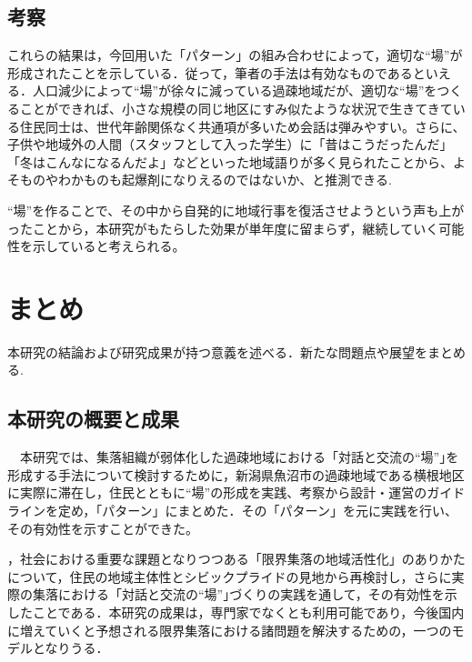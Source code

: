 \documentclass[a4paper]{jsarticle}
\begin{document}
\subsection{考察}
これらの結果は，今回用いた「パターン」の組み合わせによって，適切な“場”が形成されたことを示している．従って，筆者の手法は有効なものであるといえる．人口減少によって“場”が徐々に減っている過疎地域だが、適切な“場”をつくることができれば、小さな規模の同じ地区にすみ似たような状況で生きてきている住民同士は、世代年齢関係なく共通項が多いため会話は弾みやすい。さらに、子供や地域外の人間（スタッフとして入った学生）に「昔はこうだったんだ」「冬はこんなになるんだよ」などといった地域語りが多く見られたことから、よそものやわかものも起爆剤になりえるのではないか、と推測できる.\par“場”を作ることで、その中から自発的に地域行事を復活させようという声も上がったことから，本研究がもたらした効果が単年度に留まらず，継続していく可能性を示していると考えられる。
\newpage
\section{まとめ}
本研究の結論および研究成果が持つ意義を述べる．新たな問題点や展望をまとめる.

\subsection{本研究の概要と成果}
　本研究では、集落組織が弱体化した過疎地域における「対話と交流の“場”｣を形成する手法について検討するために，新潟県魚沼市の過疎地域である横根地区に実際に滞在し，住民とともに“場”の形成を実践、考察から設計・運営のガイドラインを定め，「パターン」にまとめた．その「パターン」を元に実践を行い、その有効性を示すことができた。



，社会における重要な課題となりつつある「限界集落の地域活性化」のありかたについて，住民の地域主体性とシビックプライドの見地から再検討し，さらに実際の集落における「対話と交流の“場”｣づくりの実践を通して，その有効性を示したことである．本研究の成果は，専門家でなくとも利用可能であり，今後国内に増えていくと予想される限界集落における諸問題を解決するための，一つのモデルとなりうる．
\newpage
\end{document}
